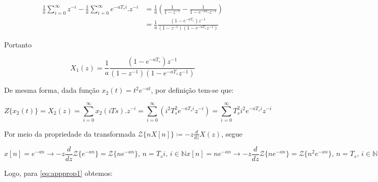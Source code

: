 \documentclass[twoside, fleqn]{article}
\begin{document}
\begin{enumerate}
        	\begin{equation}
            	\begin{split}
                	\frac{1}{a} \sum_{i=0}^{\infty} z^{-i} - \frac{1}{a} \sum_{i=0}^{\infty} e^{-a T_s i}.z^{-i} & = \frac{1}{a} \left(\frac{1}{1-z^ {-1}} - \frac{1}{1-e^{-aT_s} z^ {-1}}\right) \\
                	& = \frac{1}{a} \frac{(1 - e^{-aT_s})z^{-1}}{(1-z^{-1})(1-e^{-aT_s} z^ {-1})}
            	\end{split}
        	\end{equation}
        	
        Portanto
        	
        	\begin{equation}
            	X_1(z) = \frac{1}{a}  \frac{(1 - e^{-aT_s})z^{-1}}{(1-z^{-1})(1-e^{-aT_s} z^ {-1})}
        	\end{equation}
        
        De mesma forma, dada função $x_2(t) = t^2 e^{-a t}$, por definição tem-se que:
        
        	\begin{equation}
            	Z\{x_2(t)\} = X_2(z) = \sum_{i=0}^{\infty} x_2(i Ts).z^{-i}  = \sum_{i=0}^{\infty} \left( i^2 T_s^2 e^{-a T_s i} z^{-i} \right)  = \sum_{i=0}^{\infty} T_s^2 i^2 e^{-a T_s i} z^{-i}
        	\end{equation}
        	
        Por meio da propriedade da transformada $\mathcal{Z}\{n X[n]\} \coloneqq -z \frac{d}{dz} X(z)$, segue
        
            \begin{subequations}
                \begin{equation}
                    x[n] = e^{-an} \rightarrow -z \frac{d}{dz} \mathcal{Z}\{e^{-an}\} = \mathcal{Z}\{n e^{-an}\} \mbox{, } n = T_s i \mbox{, } i \in \mathbb{N}
                \label{eq:appprop1}
                \end{equation}
                \begin{equation}
                    x[n] = n e^{-an} \rightarrow -z \frac{d}{dz} \mathcal{Z}\{n e^{-an}\} = \mathcal{Z}\{n^2 e^{-an}\} \mbox{, } n = T_s \mbox{, } i \in \mathbb{N}
                \label{eq:appprop2}
                \end{equation}
            \end{subequations}
        
        Logo, para \eqref{eq:appprop1} obtemos:
        

\end{enumerate}
\end{document}
